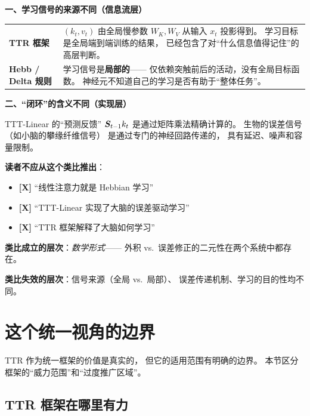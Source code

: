 \begin{analogyboundarybox}[title=这个类比在哪里失效]

\textbf{一、学习信号的来源不同（信息流层）}

\begin{tabular}{p{5cm} p{8cm}}
\textbf{TTR 框架}
& $(k_t, v_t)$ 由全局慢参数 $W_K, W_V$ 从输入 $x_t$ 投影得到。
  学习目标是全局端到端训练的结果，
  已经包含了对``什么信息值得记住''的高层判断。 \\
\textbf{Hebb / Delta 规则}
& 学习信号是\textbf{局部的}——
  仅依赖突触前后的活动，没有全局目标函数。
  神经元不知道自己的学习是否有助于``整体任务''。 \\
\end{tabular}

\medskip\textbf{二、``闭环''的含义不同（实现层）}

TTT-Linear 的``预测反馈'' $\boldsymbol{S}_{t-1} k_t$
是通过矩阵乘法精确计算的。
生物的误差信号（如小脑的攀缘纤维信号）
是通过专门的神经回路传递的，
具有延迟、噪声和容量限制。

\medskip\textbf{读者不应从这个类比推出}：
\begin{itemize}
  \item \textbf{[X]} ``线性注意力就是 Hebbian 学习''
  \item \textbf{[X]} ``TTT-Linear 实现了大脑的误差驱动学习''
  \item \textbf{[X]} ``TTR 框架解释了大脑如何学习''
\end{itemize}

\medskip
\textbf{类比成立的层次}：\textit{数学形式}——
外积 vs.\ 误差修正的二元性在两个系统中都存在。

\textbf{类比失效的层次}：信号来源（全局 vs.\ 局部）、
误差传递机制、学习的目的性均不同。

\end{analogyboundarybox}

\section{这个统一视角的边界}
\label{sec:ttr_limits}

TTR 作为统一框架的价值是真实的，
但它的适用范围有明确的边界。
本节区分框架的``威力范围''和``过度推广区域''。

\subsection*{TTR 框架在哪里有力}

